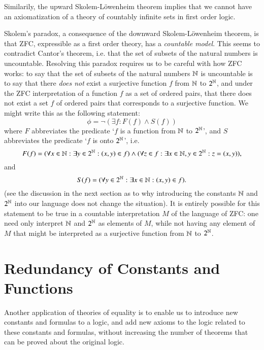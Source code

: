 \begin{remark}
    Similarily, the upward Skolem-L\"{o}wenheim theorem implies that we cannot have an axiomatization of a theory of countably infinite sets in first order logic.
\end{remark}

Skolem's paradox, a consequence of the downward Skolem-L\"{o}wenheim theorem, is that ZFC, expressible as a first order theory, has a \emph{countable model}. This seems to contradict Cantor's theorem, i.e. that the set of subsets of the natural numbers is uncountable. Resolving this paradox requires us to be careful with how ZFC works: to say that the set of subsets of the natural numbers $\operatorname{\mathbb{N}}$ is uncountable is to say that there \emph{does not} exist a surjective function $f$ from $\operatorname{\mathbb{N}}$ to $2^{\operatorname{\mathbb{N}}}$, and under the ZFC interpretation of a function $f$ as a set of ordered pairs, that there does not exist a set $f$ of ordered pairs that corresponds to a surjective function. We might write this as the following statement:
%
\[ \phi = \neg ( \exists f: F(f) \wedge S(f) ) \]
%
where $F$ abbreviates the predicate `$f$ is a function from $\operatorname{\mathbb{N}}$ to $2^{\operatorname{\mathbb{N}}}$', and $S$ abbreviates the predicate `$f$ is onto $2^{\operatorname{\mathbb{N}}}$', i.e.
%
\[ F(f) = ( \forall x \in \operatorname{\mathbb{N}} : \exists y \in 2^{\operatorname{\mathbb{N}}} : (x,y) \in f ) \wedge ( \forall z \in f : \exists x \in \operatorname{\mathbb{N}}, y \in 2^{\operatorname{\mathbb{N}}}: z = (x,y) ), \]
%
and
%
\[ S(f) = ( \forall y \in 2^{\operatorname{\mathbb{N}}} : \exists x \in \operatorname{\mathbb{N}}: (x,y) \in f ). \]
%
(see the discussion in the next section as to why introducing the constants $\operatorname{\mathbb{N}}$ and $2^{\operatorname{\mathbb{N}}}$ into our language does not change the situation). It is entirely possible for this statement to be true in a countable interpretation $M$ of the language of ZFC: one need only interpret $\operatorname{\mathbb{N}}$ and $2^{\operatorname{\mathbb{N}}}$ as elements of $M$, while not having any element of $M$ that might be interpreted as a surjective function from $\operatorname{\mathbb{N}}$ to $2^{\operatorname{\mathbb{N}}}$.

\section{Redundancy of Constants and Functions}

Another application of theories of equality is to enable us to introduce new constants and formulas to a logic, and add new axioms to the logic related to these constants and formulas, without increasing the number of theorems that can be proved about the original logic.

